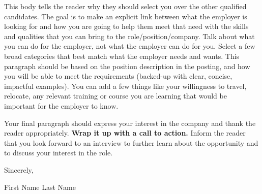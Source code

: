 \documentclass[a4paper,10pt]{article}
\begin{document}
\noindent
This body tells the reader why they should select you over the 
other qualified candidates. The goal is to make an explicit link 
between what the employer is looking for and how you are going to help 
them meet that need with the skills and qualities that you can bring 
to the role/position/company. Talk about what you can do for the employer, 
not what the employer can do for you. Select a few broad categories 
that best match what the employer needs and wants. This paragraph should 
be based on the position description in the posting, and how you will be 
able to meet the requirements (backed-up with clear, concise, impactful examples). 
You can add a few things like your willingness to travel, relocate, 
any relevant training or course you are learning that would be important 
for the employer to know.

\vspace{1em}

\noindent
Your final paragraph should express your interest in the company 
and thank the reader appropriately. \textbf{Wrap it up with a call to action.} 
Inform the reader that you look forward to an interview to 
further learn about the opportunity and to discuss your interest in the role.

\vspace{1em}

\noindent
Sincerely,

\vspace{1em}

\noindent
First Name Last Name
\end{document}
